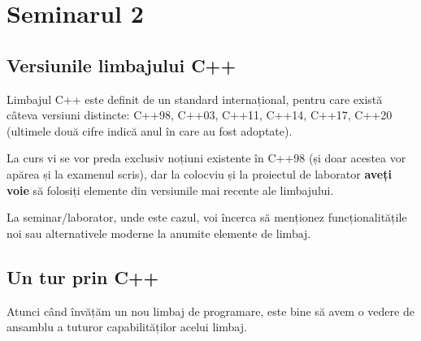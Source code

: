 \section*{Seminarul 2}

\subsection*{Versiunile limbajului C++}

Limbajul C++ este definit de un standard internațional, pentru care există câteva versiuni distincte: C++98, C++03, C++11, C++14, C++17, C++20 (ultimele două cifre indică anul în care au fost adoptate).

La curs vi se vor preda exclusiv noțiuni existente în C++98 (și doar acestea vor apărea și la examenul scris), dar la colocviu și la proiectul de laborator \textbf{aveți voie} să folosiți elemente din versiunile mai recente ale limbajului.

La seminar/laborator, unde este cazul, voi încerca să menționez funcționalitățile noi sau alternativele moderne la anumite elemente de limbaj.

\subsection*{Un tur prin C++}

Atunci când învățăm un nou limbaj de programare, este bine să avem o vedere de ansamblu a tuturor capabilităților acelui limbaj.

